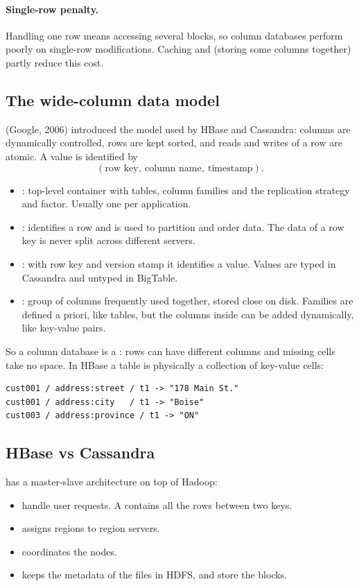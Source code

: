 \paragraph{Single-row penalty.} Handling one row means accessing several blocks, so column databases perform poorly on single-row modifications. Caching and  (storing some columns together) partly reduce this cost.

\subsection{The wide-column data model}
 (Google, 2006) introduced the model used by HBase and Cassandra: columns are dynamically controlled, rows are kept sorted, and reads and writes of a row are atomic. A value is identified by
\[
(\text{row key},\ \text{column name},\ \text{timestamp}).
\]

\begin{itemize}
  \item {}: top-level container with tables, column families and the replication strategy and factor. Usually one per application.
  \item {}: identifies a row and is used to partition and order data. The data of a row key is never split across different servers.
  \item {}: with row key and version stamp it identifies a value. Values are typed in Cassandra and untyped in BigTable.
  \item {}: group of columns frequently used together, stored close on disk. Families are defined a priori, like tables, but the columns inside can be added dynamically, like key-value pairs.
\end{itemize}

So a column database is a : rows can have different columns and missing cells take no space. In HBase a table is physically a collection of key-value cells:
\begin{lstlisting}
cust001 / address:street / t1 -> "178 Main St."
cust001 / address:city   / t1 -> "Boise"
cust003 / address:province / t1 -> "ON"
\end{lstlisting}

\subsection{HBase vs Cassandra}
 has a master-slave architecture on top of Hadoop:
\begin{itemize}
  \item {} handle user requests. A  contains all the rows between two keys.
  \item {} assigns regions to region servers.
  \item {} coordinates the nodes.
  \item {} keeps the metadata of the files in HDFS, and  store the blocks.
\end{itemize}

